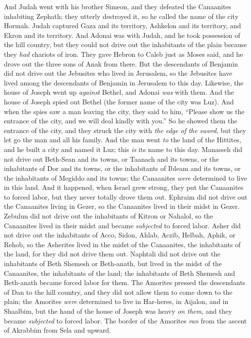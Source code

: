 \begin{biblechapter}
\verse And Judah went with his brother Simeon, and they defeated the Canaanites inhabiting Zephath; they utterly destroyed it, so he called the name of the city Hormah.
\verse Judah captured Gaza and its territory, Ashkelon and its territory, and Ekron and its territory.
\verse And Adonai was with Judah, and he took possession of the hill country, but they could not drive out the inhabitants of the plain because they \textit{had} chariots of iron.
\verse They gave Hebron to Caleb just as Moses said, and he drove out the three sons of Anak from there.
\verse But the descendants of Benjamin did not drive out the Jebusites who lived in Jerusalem, so the Jebusites have lived among the descendants of Benjamin in Jerusalem to this day.
\verse Likewise, the house of Joseph went up \textit{against} Bethel, and Adonai \textit{was} with them.
\verse And the house of Joseph spied out Bethel (the former name of the city was Luz).
\verse And when the spies saw a man leaving the city, they said to him, “Please show us the entrance of the city, and we will deal kindly with you.”
\verse So he showed them the entrance of the city, and they struck the city with \textit{the edge of the sword}, but they let go the man and all his family.
\verse And the man went \textit{to} the land of the Hittites, and he built a city and named it Luz; this \textit{is} its name to this day.
\verse Manasseh did not drive out Beth-Sean and its towns, or Taanach and its towns, or the inhabitants of Dor and its towns, or the inhabitants of Ibleam and its towns, or the inhabitants of Megiddo and its towns; the Canaanites \textit{were} determined to live in this land.
\verse And it happened, when Israel grew strong, they put the Canaanites to forced labor, but they never totally drove them out.
\verse Ephraim did not drive out the Canaanites living in Gezer, so the Canaanites lived in their midst in Gezer.
\verse Zebulun did not drive out the inhabitants of Kitron or Nahalol, so the Canaanites lived in their midst and became \textit{subjected} to forced labor.
\verse Asher did not drive out the inhabitants of Acco, Sidon, Ahlab, Aczib, Helbah, Aphik, or Rehob,
\verse so the Asherites lived in the midst of the Canaanites, the inhabitants of the land, for they did not drive them out.
\verse Naphtali did not drive out the inhabitants of Beth Shemesh or Beth-anath, but lived in the midst of the Canaanites, the inhabitants of the land; the inhabitants of Beth Shemesh and Beth-anath became forced labor for them.
\verse The Amorites pressed the descendants of Dan to the hill country, and they did not allow them to come down to the plain;
\verse the Amorites \textit{were} determined to live in Har-heres, in Aijalon, and in Shaalbim, but the hand of the house of Joseph was heavy \textit{on them}, and they became \textit{subjected} to forced labor.
\verse The border of the Amorites \textit{ran} from the ascent of Akrabbim from Sela and upward.
\end{biblechapter}

